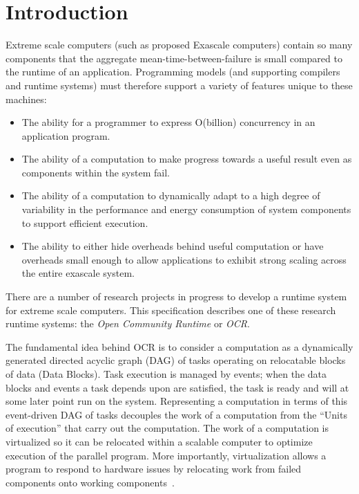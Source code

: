 %

\chapter{Introduction}
\label{chap:introduction}
Extreme scale computers (such as proposed Exascale computers) contain
so many components that the aggregate mean-time-between-failure is small
compared to the runtime of an application. Programming models (and
supporting compilers and runtime systems) must therefore support a
variety of features unique to these machines:
\begin{itemize}
\item The ability for a programmer to
express O(billion) concurrency in an application program.

\item The ability of a computation to make progress towards a useful
result even as components within the system fail.

\item The ability of a computation to dynamically adapt to a high
degree of variability in the performance and energy consumption of
system components to support efficient execution.

\item The ability to either hide overheads behind useful computation
or have overheads small enough to allow applications to exhibit strong
scaling across the entire exascale system.

\end{itemize}

There are a number of research projects in progress to develop a runtime system
for extreme scale computers. This specification describes one of
these research runtime systems: the \emph{Open Community Runtime} or \emph{OCR}.

The fundamental idea behind OCR is to consider a computation as a
dynamically generated directed acyclic graph (DAG) of tasks operating on
relocatable blocks of data (Data Blocks). Task execution is managed by events;
when the data blocks and events a task depends upon are satisfied, the
task is ready and will at some later point run on the system.
Representing a computation in terms of this event-driven DAG of tasks
decouples the work of a computation
from the ``Units of execution'' that carry out the computation.  The work
of a computation is virtualized so it can be relocated within a scalable computer to
optimize execution of the parallel program. More importantly,
virtualization allows a program to respond to hardware issues by
relocating work from failed components onto working
components~\cite{Vrvilo14}.


